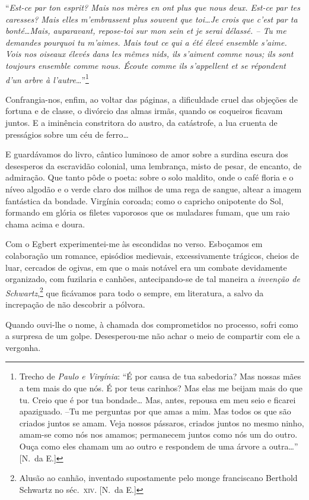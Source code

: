 ``\textit{Est{}-ce par ton esprit? Mais
nos mères en ont plus que nous deux. Est{}-ce par tes caresses? Mais
elles m'embrassent plus souvent que toi\ldots Je crois que c'est par ta
bonté\ldots Mais, auparavant, repose{}-toi sur mon sein et je serai
délassé. -- Tu me demandes pourquoi tu m'aimes. Mais tout ce qui a été
élevé ensemble s'aime. Vois nos oiseaux élevés dans les mêmes nids, ils
s'aiment comme nous; ils sont toujours ensemble comme nous. Écoute
comme ils s'appellent et se répondent d'un arbre à l'autre}\ldots''\footnote{ Trecho 
de \textit{Paulo e Virgínia}: ``É por causa de tua sabedoria? Mas nossas mães a tem 
mais do que nós. É por teus carinhos? 
Mas elas me beijam mais do que tu. Creio que é por tua bondade\ldots 
Mas, antes, repousa em meu seio e ficarei apaziguado. 
--Tu me perguntas por que amas a mim. Mas todos os que são criados juntos se amam. Veja 
nossos pássaros, criados juntos no mesmo ninho, amam-se como nós nos amamos; 
permanecem juntos como nós um do outro. Ouça como eles chamam um ao outro e 
respondem de uma árvore a outra\ldots'' [N.~da E.]}

Confrangia{}-nos, enfim, ao voltar das páginas, a dificuldade cruel das
objeções de fortuna e de classe, o divórcio das almas irmãs, quando os
coqueiros ficavam juntos. E a iminência constritora do austro, da
catástrofe, a lua cruenta de presságios sobre um céu de ferro\ldots 

E guardávamos do livro, cântico luminoso de amor sobre a surdina escura
dos desesperos da escravidão colonial, uma lembrança, misto de pesar,
de encanto, de admiração. Que tanto pôde o poeta: sobre o solo maldito,
onde o café floria e o níveo algodão e o verde claro dos milhos de uma
rega de sangue, altear a imagem fantástica da bondade. Virgínia
coroada; como o capricho onipotente do Sol, formando em glória os
filetes vaporosos que os muladares fumam, que um raio chama acima e
doura. 

Com o Egbert experimentei{}-me às escondidas no verso. Esboçamos
em colaboração um romance, episódios medievais, excessivamente
trágicos, cheios de luar, cercados de ogivas, em que o mais notável era
um combate devidamente organizado, com fuzilaria e canhões,
antecipando{}-se de tal maneira a \textit{invenção de Schwartz},\footnote{ Alusão ao canhão, 
inventado supostamente pelo monge franciscano Berthold Schwartz no séc.~\textsc{xiv}. [N.~da E.]} 
que ficávamos para todo o sempre, em literatura, a salvo da increpação de não
descobrir a pólvora. 

Quando ouvi{}-lhe o nome, à chamada dos
comprometidos no processo, sofri como a surpresa de um golpe.
Desesperou{}-me não achar o meio de compartir com ele a vergonha. 

